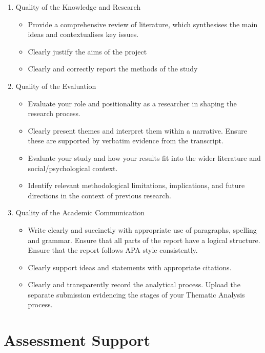 \documentclass[
  english,
  letterpaper,
  DIV=11,
  numbers=noendperiod]{scrreprt}
\providecommand{\tightlist}{%
  \setlength{\itemsep}{0pt}\setlength{\parskip}{0pt}}
\begin{document}
\begin{enumerate}
\def\labelenumi{\arabic{enumi}.}
\item
  Quality of the Knowledge and Research

  \begin{itemize}
  \tightlist
  \item
    Provide a comprehensive review of literature, which synthesises the
    main ideas and contextualises key issues.
  \item
    Clearly justify the aims of the project
  \item
    Clearly and correctly report the methods of the study
  \end{itemize}
\item
  Quality of the Evaluation

  \begin{itemize}
  \tightlist
  \item
    Evaluate your role and positionality as a researcher in shaping the
    research process.
  \item
    Clearly present themes and interpret them within a narrative. Ensure
    these are supported by verbatim evidence from the transcript.
  \item
    Evaluate your study and how your results fit into the wider
    literature and social/psychological context.
  \item
    Identify relevant methodological limitations, implications, and
    future directions in the context of previous research.
  \end{itemize}
\item
  Quality of the Academic Communication

  \begin{itemize}
  \tightlist
  \item
    Write clearly and succinctly with appropriate use of paragraphs,
    spelling and grammar. Ensure that all parts of the report have a
    logical structure. Ensure that the report follows APA style
    consistently.
  \item
    Clearly support ideas and statements with appropriate citations.
  \item
    Clearly and transparently record the analytical process. Upload the
    separate submission evidencing the stages of your Thematic Analysis
    process.
  \end{itemize}
\end{enumerate}

\section{Assessment Support}\label{assessment-support-3}
\end{document}
